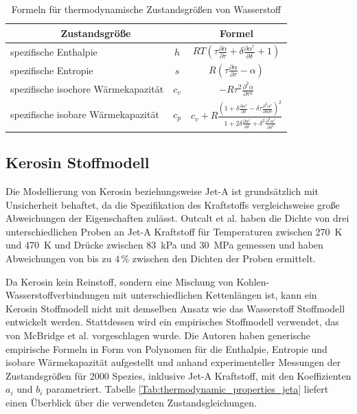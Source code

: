 \begin{table}[ht]
	\centering
	\caption{Formeln für thermodynamische Zustandsgrößen von Wasserstoff}
	\begin{tabular} {|l|c|c|} \hline%
		\multicolumn{2}{|c|}{Zustandsgröße}  & Formel\\ \hline\hline%
		spezifische Enthalpie &$h$ 		  & $RT(\tau\frac{\partial\alpha}{\partial\tau}+\delta\frac{\partial\alpha^r}{\partial\delta}+1)$ \\ \hline%
		spezifische Entropie& $s$ 		      &  $R(\tau\frac{\partial\alpha}{\partial\tau}-\alpha)$\\ \hline%
		spezifische isochore Wärmekapazität &$c_v$ 	    &  $-R\tau^2\frac{\partial^2\alpha}{\partial\tau^2}$\\ \hline%
		spezifische isobare Wärmekapazität &$c_p$        &  $c_v+R\frac{\left(1+\delta\frac{\partial\alpha^r}{\partial\delta}-\delta\tau\frac{\partial^2\alpha^r}{\partial\delta\partial\tau}\right)^2}{1+2\delta\frac{\partial\alpha^r}{\partial\delta}+\delta^2\frac{\partial^2\alpha^r}{\partial\delta^2}}$\\ \hline%
	\end{tabular}	
	\label{Tab:thermodynamic_properties_h2}%
\end{table}
\FloatBarrier 

\subsection{Kerosin Stoffmodell}

Die Modellierung von Kerosin beziehungsweise Jet-A ist grundsätzlich mit Unsicherheit behaftet, da die Spezifikation des Kraftstoffs vergleichsweise große Abweichungen der Eigenschaften zulässt. Outcalt et al. \cite{Outcalt.2009} haben die Dichte von drei unterschiedlichen Proben an Jet-A Kraftstoff für Temperaturen zwischen \SI{270}{\K} und \SI{470}{\K} und Drücke zwischen \SI{83}{\kilo\Pa} und \SI{30}{\mega\Pa} gemessen und haben Abweichungen von bis zu $4\,\%$ zwischen den Dichten der Proben ermittelt.

Da Kerosin kein Reinstoff, sondern eine Mischung von Kohlen-Wasserstoffverbindungen mit unterschiedlichen Kettenlängen ist, kann ein Kerosin Stoffmodell nicht mit demselben Ansatz wie das Wasserstoff Stoffmodell entwickelt werden. Stattdessen wird ein empirisches Stoffmodell verwendet, das von McBridge et al. \cite{McBridge.2002} vorgeschlagen wurde. Die Autoren haben generische empirische Formeln in Form von Polynomen für die Enthalpie, Entropie und isobare Wärmekapazität aufgestellt und anhand experimenteller Messungen der Zustandsgrößen für 2000 Spezies, inklusive Jet-A Kraftstoff, mit den Koeffizienten $a_i$ und $b_i$ parametriert. Tabelle \ref{Tab:thermodynamic_properties_jeta} liefert einen Überblick über die verwendeten Zustandsgleichungen.

